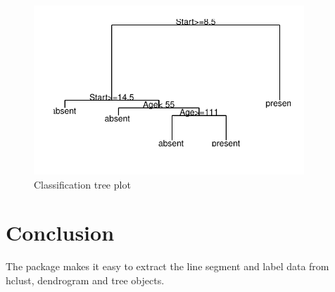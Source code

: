 \documentclass[10pt,oneside]{article}
\begin{document}
\begin{figure}[h]
\begin{center}
\includegraphics[width=4in, height=2.5in]{ggdendro-rpart1}
\end{center}
\caption{Classification tree plot}
\end{figure}


\section{Conclusion}

The \ggdendro{} package makes it easy to extract the line segment and label data from hclust, dendrogram and tree objects.


\end{document}
